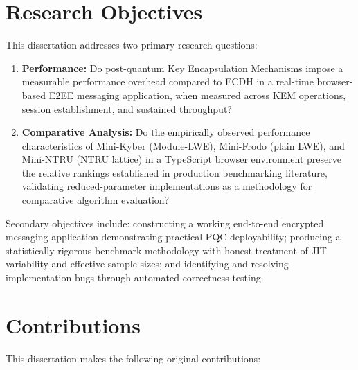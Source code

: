 \documentclass[12pt,a4paper]{report}
\begin{document}
\section{Research Objectives}

This dissertation addresses two primary research questions:

\begin{enumerate}[label=\textbf{RQ\arabic*:}]
  \item \textbf{Performance:} Do post-quantum Key Encapsulation Mechanisms impose a
  measurable performance overhead compared to ECDH in a real-time browser-based E2EE
  messaging application, when measured across KEM operations, session establishment,
  and sustained throughput?

  \item \textbf{Comparative Analysis:} Do the empirically observed performance
  characteristics of Mini-Kyber (Module-LWE), Mini-Frodo (plain LWE), and Mini-NTRU
  (NTRU lattice) in a TypeScript browser environment preserve the relative rankings
  established in production benchmarking literature, validating reduced-parameter
  implementations as a methodology for comparative algorithm evaluation?
\end{enumerate}

Secondary objectives include: constructing a working end-to-end encrypted messaging
application demonstrating practical PQC deployability; producing a statistically
rigorous benchmark methodology with honest treatment of JIT variability and effective
sample sizes; and identifying and resolving implementation bugs through automated
correctness testing.

\section{Contributions}

This dissertation makes the following original contributions:
\end{document}
